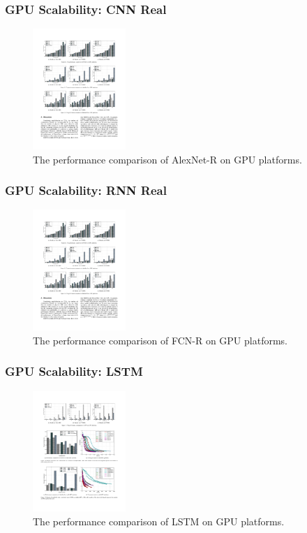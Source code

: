 
\begin{frame}
	\MyLogo
	\frametitle{GPU Scalability: CNN Real}

	\begin{figure}[htbp] 
		\includegraphics[height=1.8in]{figures/AlexNet-R2.pdf} 
		\caption{The performance comparison of AlexNet-R on GPU platforms.}
	\end{figure}

\end{frame}


\begin{frame}
	\MyLogo
	\frametitle{GPU Scalability: RNN Real}
	
	\begin{figure}[htbp] 
		\includegraphics[height=1.8in]{figures/FCN-R2.pdf} 
		\caption{The performance comparison of FCN-R on GPU platforms.}
	\end{figure}

\end{frame}


\begin{frame}
	\MyLogo
	\frametitle{GPU Scalability: LSTM}
	
	\begin{figure}[htbp] 
		\includegraphics[height=1.8in]{figures/LSTM2.pdf} 
		\caption{The performance comparison of LSTM on GPU platforms.}
	\end{figure}
	
\end{frame}